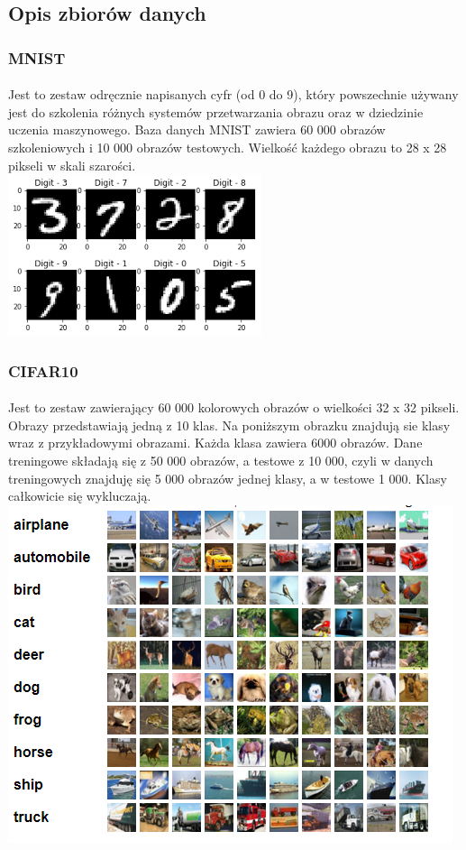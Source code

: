 \documentclass[a4paper,11pt]{article}
\begin{document}
\subsection{Opis zbiorów danych}
\subsubsection{MNIST}
\paragraph{}Jest to zestaw odręcznie napisanych cyfr (od 0 do 9), który powszechnie używany jest do szkolenia różnych systemów przetwarzania obrazu oraz w dziedzinie uczenia maszynowego. Baza danych MNIST zawiera 60 000 obrazów szkoleniowych i 10 000 obrazów testowych. Wielkość każdego obrazu to 28 x 28 pikseli w skali szarości. \\
\includegraphics{MNIST}

\subsubsection{CIFAR10}
\paragraph{}Jest to zestaw zawierający 60 000 kolorowych obrazów o wielkości 32 x 32 pikseli. Obrazy przedstawiają jedną z 10 klas. Na poniższym obrazku znajdują sie klasy wraz z przykładowymi obrazami. Każda klasa zawiera 6000 obrazów. Dane treningowe składają się z 50 000 obrazów, a testowe z 10 000, czyli w danych treningowych znajduję się 5 000 obrazów jednej klasy, a w testowe 1 000. Klasy całkowicie się wykluczają.\\
\includegraphics{cifar10}
\end{document}
